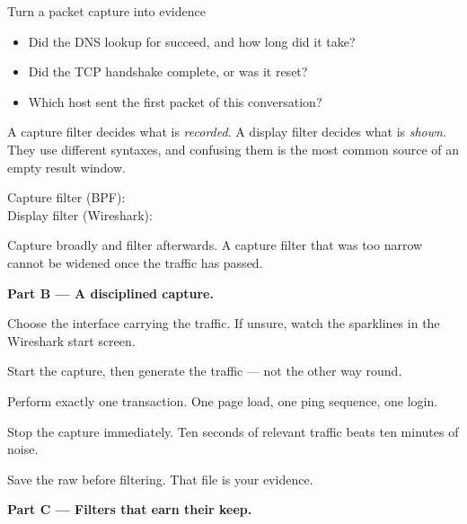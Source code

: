 \begin{labproject}{Turn a packet capture into evidence}
\begin{itemize}
  \item Did the DNS lookup for  succeed, and how long did it take?
  \item Did the TCP handshake complete, or was it reset?
  \item Which host sent the first packet of this conversation?
\end{itemize}

\begin{keyidea}
A capture filter decides what is \emph{recorded}. A display filter decides what is \emph{shown}. They use different syntaxes, and confusing them is the most common source of an empty result window.

Capture filter (BPF): \\
Display filter (Wireshark): 

Capture broadly and filter afterwards. A capture filter that was too narrow cannot be widened once the traffic has passed.
\end{keyidea}

\medskip\noindent\textbf{Part B --- A disciplined capture.}\par

\begin{utpsteps}
  \item Choose the interface carrying the traffic. If unsure, watch the sparklines in the Wireshark start screen.
  \item Start the capture, then generate the traffic --- not the other way round.
  \item Perform exactly one transaction. One page load, one ping sequence, one login.
  \item Stop the capture immediately. Ten seconds of relevant traffic beats ten minutes of noise.
  \item Save the raw  before filtering. That file is your evidence.
\end{utpsteps}

\medskip\noindent\textbf{Part C --- Filters that earn their keep.}\par


\end{labproject}
